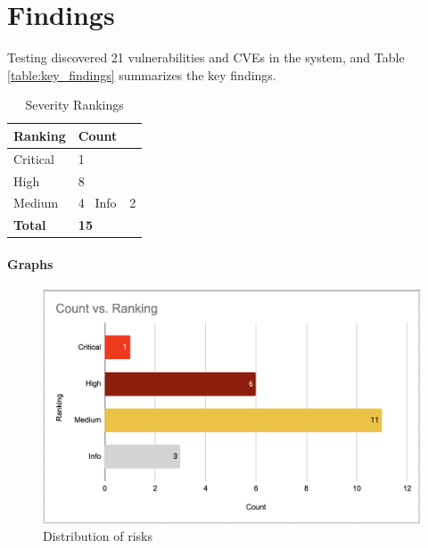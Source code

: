\chapter{Findings}
Testing discovered 21 vulnerabilities and CVEs in the system, and Table \ref{table:key_findings} summarizes the key findings.

\begingroup
\centering
\setlength{\tabcolsep}{6.5pt} %
\renewcommand{\arraystretch}{1.8} %
\begin{longtable}{ |p{5cm}| p{10cm} |}
\caption{Severity Rankings}
    \label{table:rankings}
\hline
{}
\textbf{Ranking}  & \textbf{Count}\\
\hline
Critical  & 1\\
\hline
High  & 8\\
\hline
Medium  & 4\
\hline
Info  & 2\\
\hline
\hline
\textbf{Total}  & \textbf{15}\\
\hline
\end{longtable}
\endgroup
\newpage

\subsubsection{Graphs}
\begin{figure}[h!]
\centering
\includegraphics[width=\textwidth]{pics/rankings.png}
\caption{Distribution of risks}\label{fig:bar_risks}
\end{figure}

